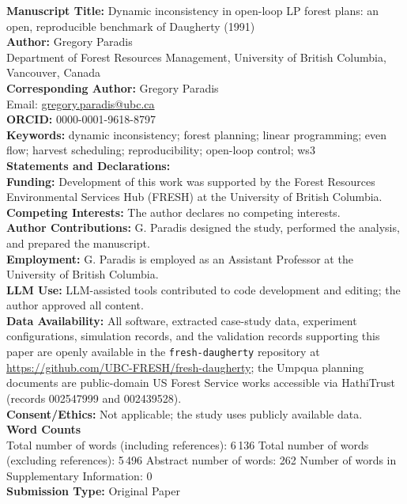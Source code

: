 \documentclass[12pt]{article}
\begin{document}
\thispagestyle{empty}
\doublespacing

\textbf{Manuscript Title:} Dynamic inconsistency in open-loop LP forest plans: an open, reproducible benchmark of Daugherty (1991)\\[1ex]
\textbf{Author:} Gregory Paradis\\
Department of Forest Resources Management, University of British Columbia, Vancouver, Canada\\[1ex]
\textbf{Corresponding Author:} Gregory Paradis\\
Email: \href{mailto:gregory.paradis@ubc.ca}{gregory.paradis@ubc.ca}\\[1ex]
\textbf{ORCID:} 0000-0001-9618-8797\\[1ex]
\textbf{Keywords:} dynamic inconsistency; forest planning; linear programming; even flow; harvest scheduling; reproducibility; open-loop control; ws3\\[1ex]
\textbf{Statements and Declarations:}\\
\textbf{Funding:} Development of this work was supported by the Forest Resources Environmental Services Hub (FRESH) at the University of British Columbia.\\
\textbf{Competing Interests:} The author declares no competing interests.\\
\textbf{Author Contributions:} G. Paradis designed the study, performed the analysis, and prepared the manuscript.\\
\textbf{Employment:} G. Paradis is employed as an Assistant Professor at the University of British Columbia.\\
\textbf{LLM Use:} LLM-assisted tools contributed to code development and editing; the author approved all content.\\
\textbf{Data Availability:} All software, extracted case-study data, experiment configurations, simulation records, and the validation records supporting this paper are openly available in the \texttt{fresh-daugherty} repository at \url{https://github.com/UBC-FRESH/fresh-daugherty}; the Umpqua planning documents are public-domain US Forest Service works accessible via HathiTrust (records 002547999 and 002439528).\\
\textbf{Consent/Ethics:} Not applicable; the study uses publicly available data.\\[1ex]
\textbf{Word Counts}\\
Total number of words (including references): 6\,136
Total number of words (excluding references): 5\,496
Abstract number of words: 262
Number of words in Supplementary Information: 0\\[1ex]
\textbf{Submission Type:} Original Paper\\
\end{document}
